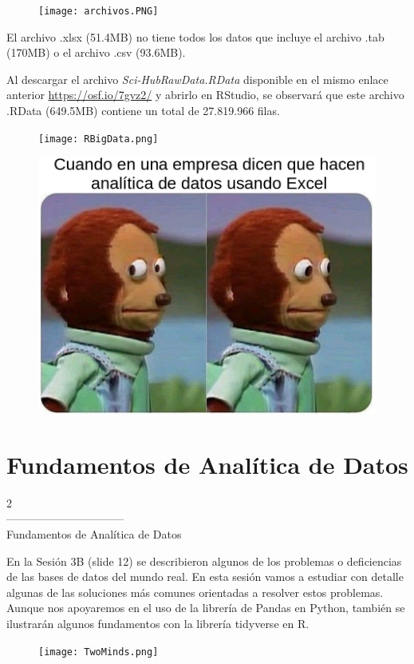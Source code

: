 \documentclass[aspectratio=169]{beamer}
\begin{document}
\begin{frame}
\begin{figure}
\centering
\texttt{[image: archivos.PNG]}
\end{figure}
El archivo .xlsx (51.4MB) no tiene todos los datos que incluye el archivo .tab (170MB) o el archivo .csv (93.6MB).
\end{frame}


\begin{frame}
Al descargar el archivo \textit{Sci-HubRawData.RData} disponible en el mismo enlace anterior \textcolor{blue}{\url{https://osf.io/7gvz2/}} y abrirlo en RStudio, se observará que este archivo .RData (649.5MB) contiene un total de 27.819.966 filas.
\begin{figure}
\centering
\texttt{[image: RBigData.png]}
\end{figure}
\end{frame}

\begin{frame}
\begin{figure}
\centering
\includegraphics[width=.65\textwidth]{meme.png}
\end{figure}
\end{frame}


\section{Fundamentos de Analítica de Datos}
\begin{frame}
\begin{center}
\Huge
\textcolor{azulcesaclaro}{2\\
--------------------------------\\
Fundamentos de Analítica de Datos}
\end{center}
\end{frame}

\begin{frame}
En la Sesión 3B (slide 12) se describieron algunos de los problemas o deficiencias de las bases de datos del mundo real. En esta sesión vamos a estudiar con detalle algunas de las soluciones más comunes orientadas a resolver estos problemas. Aunque nos apoyaremos en el uso de la librería de Pandas en Python, también se ilustrarán algunos fundamentos con la librería tidyverse en R. 
\begin{figure}
\centering
\texttt{[image: TwoMinds.png]}
\end{figure}
\end{frame}
\end{document}
